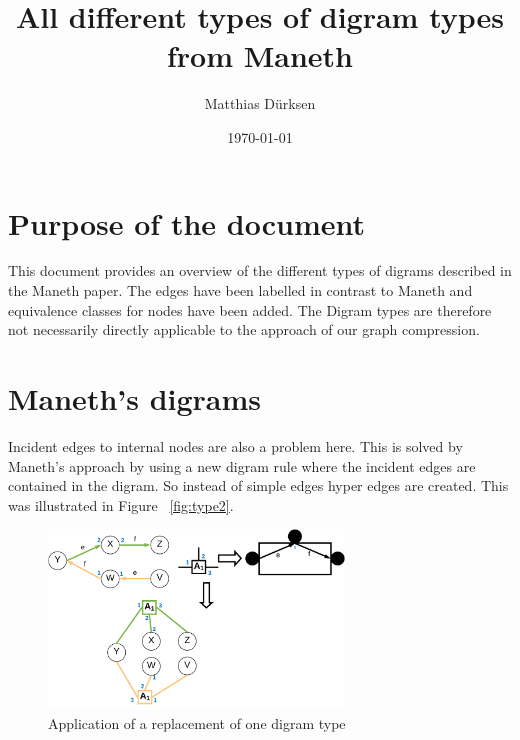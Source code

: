 \documentclass[a4paper]{scrartcl}
\title{All different types of digram types from Maneth}
\author{Matthias Dürksen}
\date{\today}
\begin{document}
\maketitle
\section*{Purpose of the document}
This document provides an overview of the different types of digrams described in the Maneth paper.
The edges have been labelled in contrast to Maneth and equivalence classes for nodes have been added. The Digram types are therefore not necessarily directly applicable to the approach of our graph compression.

\section{Maneth's digrams}


Incident edges to internal nodes are also a problem here. This is solved by Maneth's approach by using a new digram rule where the incident edges are contained in the digram. So instead of simple edges hyper edges are created. This was illustrated in Figure ~\ref{fig:type2}.






\begin{figure}[h]
	\centering
	\includegraphics[width=0.7\textwidth]{img/type1}
	\caption{Application of a replacement of one digram type}
	\label{fig:type1}
\end{figure}
\end{document}
